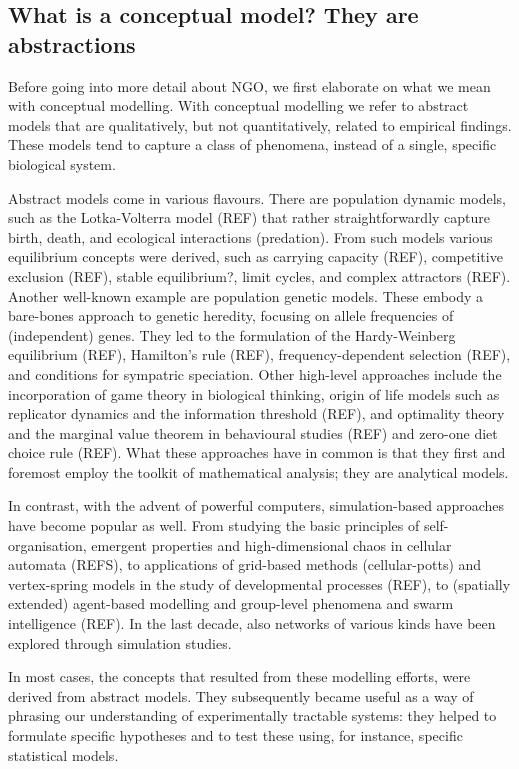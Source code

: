 \subsection{What is a conceptual model? They are abstractions}

Before going into more detail about NGO, we first elaborate on what we mean with conceptual modelling. With conceptual modelling we refer to abstract models that are qualitatively, but not quantitatively, related to empirical findings. These models tend to capture a class of phenomena, instead of a single, specific biological system.

Abstract models come in various flavours. There are population dynamic models, such as the Lotka-Volterra model (REF) that rather straightforwardly capture birth, death, and ecological interactions (predation). From such models various equilibrium concepts were derived, such as carrying capacity (REF), competitive exclusion (REF), stable equilibrium?, limit cycles, and complex attractors (REF). Another well-known example are population genetic models. These embody a bare-bones approach to genetic heredity, focusing on allele frequencies of (independent) genes. They led to the formulation of the Hardy-Weinberg equilibrium (REF), Hamilton’s rule (REF), frequency-dependent selection (REF), and conditions for sympatric speciation. Other high-level approaches include the incorporation of game theory in biological thinking, origin of life models such as replicator dynamics and the information threshold (REF), and optimality theory and the marginal value theorem in behavioural studies (REF) and zero-one diet choice rule (REF). What these approaches have in common is that they first and foremost employ the toolkit of mathematical analysis; they are analytical models.

In contrast, with the advent of powerful computers, simulation-based approaches have become popular as well. From studying the basic principles of self-organisation, emergent properties and high-dimensional chaos in cellular automata (REFS), to applications of grid-based methods (cellular-potts) and vertex-spring models in the study of developmental processes (REF), to (spatially extended) agent-based modelling and group-level phenomena and swarm intelligence (REF). In the last decade, also networks of various kinds have been explored through simulation studies.

In most cases, the concepts that resulted from these modelling efforts, were derived from abstract models. They subsequently became useful as a way of phrasing our understanding of experimentally tractable systems: they helped to formulate specific hypotheses and to test these using, for instance, specific statistical models.
  